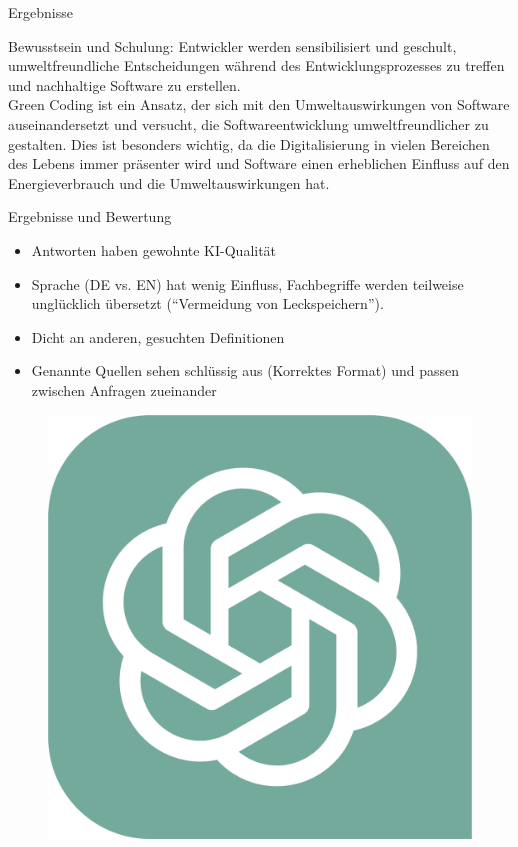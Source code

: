 \documentclass[10pt,aspectratio=169]{beamer}
\begin{document}
\begin{frame}{Ergebnisse}
\begin{minipage}{0.94\linewidth}
\begin{framed}
        Bewusstsein und Schulung: Entwickler werden sensibilisiert und geschult, umweltfreundliche Entscheidungen während des Entwicklungsprozesses zu treffen und nachhaltige Software zu erstellen.\\[2mm]
        Green Coding ist ein Ansatz, der sich mit den Umweltauswirkungen von Software auseinandersetzt und versucht, die Softwareentwicklung umweltfreundlicher zu gestalten. Dies ist besonders wichtig, da die Digitalisierung in vielen Bereichen des Lebens immer präsenter wird und Software einen erheblichen Einfluss auf den Energieverbrauch und die Umweltauswirkungen hat.
    \end{framed}
    \end{minipage}
\end{frame}

\begin{frame}{Ergebnisse und Bewertung}
\begin{minipage}{0.5\linewidth}
    \begin{itemize}
        \item Antworten haben gewohnte KI-Qualität
        \item Sprache (DE vs. EN) hat wenig Einfluss, Fachbegriffe werden teilweise unglücklich übersetzt (``Vermeidung von Leckspeichern'').
        \item Dicht an anderen, gesuchten Definitionen
        \item Genannte Quellen sehen schlüssig aus (Korrektes Format) und passen zwischen Anfragen zueinander
    \end{itemize}
\end{minipage}
\begin{minipage}{0.05\linewidth}
        \scriptsize
        \begin{figure}[!ht]
            \includegraphics[width=\linewidth]{assets/ChatGPT_logo.pdf}

\end{figure}
\end{minipage}
\end{frame}
\end{document}
